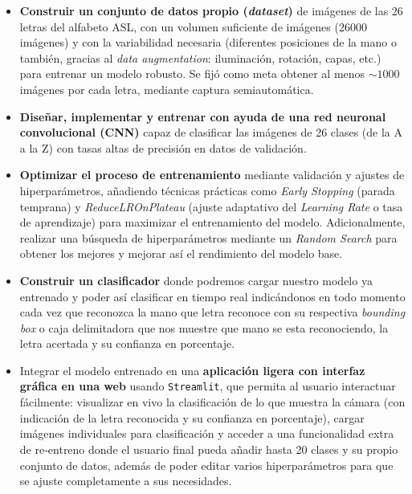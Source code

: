 \begin{itemize}

    \item \textbf{Construir un conjunto de datos propio (\textit{dataset})} de imágenes de las 26 letras del alfabeto ASL, con un volumen suficiente de imágenes (26000 imágenes) y con la variabilidad necesaria (diferentes posiciones de la mano o también, gracias al \textit{data augmentation}: iluminación, rotación, capas, etc.) para entrenar un modelo robusto. Se fijó como meta obtener al menos $\sim1000$ imágenes por cada letra, mediante captura semiautomática. 

    \item \textbf{Diseñar, implementar y entrenar con ayuda de una red neuronal convolucional (CNN)} capaz de clasificar las imágenes de 26 clases (de la A a la Z) con tasas altas de precisión en datos de validación.

    \item \textbf{Optimizar el proceso de entrenamiento} mediante validación y ajustes de hiperparámetros, añadiendo técnicas prácticas como \textit{Early Stopping} (parada temprana) y \textit{ReduceLROnPlateau} (ajuste adaptativo del \textit{Learning Rate} o tasa de aprendizaje) para maximizar el entrenamiento del modelo. Adicionalmente, realizar una búsqueda de hiperparámetros mediante un \textit{Random Search} para obtener los mejores y mejorar así el rendimiento del modelo base.

    \item \textbf{Construir un clasificador} donde podremos cargar nuestro modelo ya entrenado y poder así clasificar en tiempo real indicándonos en todo momento cada vez que reconozca la mano que letra reconoce con su respectiva \textit{bounding box} o caja delimitadora que nos muestre que mano se esta reconociendo, la letra acertada y su confianza en porcentaje.

    \item Integrar el modelo entrenado en una \textbf{aplicación ligera con interfaz gráfica en una web} usando \texttt{Streamlit}, que permita al usuario interactuar fácilmente: visualizar en vivo la clasificación de lo que muestra la cámara (con indicación de la letra reconocida y su confianza en porcentaje), cargar imágenes individuales para clasificación y acceder a una funcionalidad extra de re-entreno donde el usuario final pueda añadir hasta 20 clases y su propio conjunto de datos, además de poder editar varios hiperparámetros para que se ajuste completamente a sus necesidades.  


\end{itemize}
